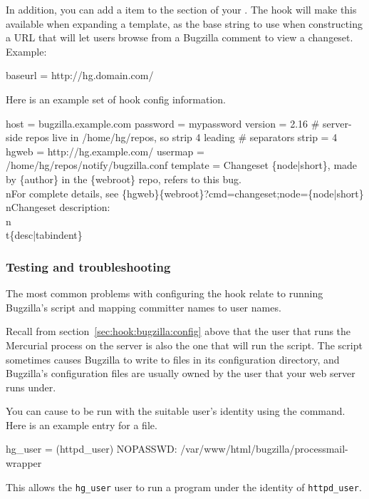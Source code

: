 In addition, you can add a  item to the
 section of your \hgrc.  The  hook will
make this available when expanding a template, as the base string to
use when constructing a URL that will let users browse from a Bugzilla
comment to view a changeset.  Example:
\begin{codesample2}
  [web]
  baseurl = http://hg.domain.com/
\end{codesample2}

Here is an example set of  hook config information.
\begin{codesample2}
  [bugzilla]
  host = bugzilla.example.com
  password = mypassword
  version = 2.16
  # server-side repos live in /home/hg/repos, so strip 4 leading
  # separators
  strip = 4
  hgweb = http://hg.example.com/
  usermap = /home/hg/repos/notify/bugzilla.conf
  template = Changeset \{node|short\}, made by \{author\} in the \{webroot\}
    repo, refers to this bug.\\nFor complete details, see 
    \{hgweb\}\{webroot\}?cmd=changeset;node=\{node|short\}\\nChangeset
    description:\\n\\t\{desc|tabindent\}
\end{codesample2}

\subsubsection{Testing and troubleshooting}

The most common problems with configuring the  hook
relate to running Bugzilla's  script and mapping
committer names to user names.

Recall from section~\ref{sec:hook:bugzilla:config} above that the user
that runs the Mercurial process on the server is also the one that
will run the  script.  The
 script sometimes causes Bugzilla to write to
files in its configuration directory, and Bugzilla's configuration
files are usually owned by the user that your web server runs under.

You can cause  to be run with the suitable
user's identity using the  command.  Here is an example
entry for a  file.
\begin{codesample2}
  hg_user = (httpd_user) NOPASSWD: /var/www/html/bugzilla/processmail-wrapper %
\end{codesample2}
This allows the \texttt{hg\_user} user to run a
 program under the identity of
\texttt{httpd\_user}.

